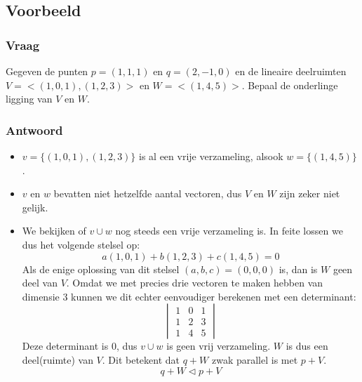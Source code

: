 \documentclass[main.tex]{subfiles}
\begin{document}
\subsection{Voorbeeld}

\subsubsection{Vraag}
\begin{center}
  Gegeven de punten $p=(1,1,1)$ en $q=(2,-1,0)$ en de lineaire deelruimten $V=<(1,0,1),(1,2,3)>$ en $W=<(1,4,5)>$. Bepaal de onderlinge ligging van $V$ en $W$.
\end{center}

\subsubsection{Antwoord}
\begin{itemize}
\item $v=\{(1,0,1),(1,2,3)\}$ is al een vrije verzameling, alsook $w=\{(1,4,5)\}$.
\item $v$ en $w$ bevatten niet hetzelfde aantal vectoren, dus $V$ en $W$ zijn zeker niet gelijk.
\item We bekijken of $v\cup w$ nog steeds een vrije verzameling is.
  In feite lossen we dus het volgende stelsel op:
  \[
  a(1,0,1) + b(1,2,3) + c(1,4,5) = 0
  \]
  Als de enige oplossing van dit stelsel $(a,b,c) = (0,0,0)$ is, dan is $W$ geen deel van $V$.
  Omdat we met precies drie vectoren te maken hebben van dimensie $3$ kunnen we dit echter eenvoudiger berekenen met een determinant:
  \[
  \begin{vmatrix}
    1 & 0 & 1\\
    1 & 2 & 3\\
    1 & 4 & 5
  \end{vmatrix}
  \]
  Deze determinant is $0$, dus $v\cup w$ is geen vrij verzameling. $W$ is dus een deel(ruimte) van $V$.
  Dit betekent dat $q+W$ zwak parallel is met $p+V$.
  \[ q+W \triangleleft p+V \]
\end{itemize}
\end{document}
